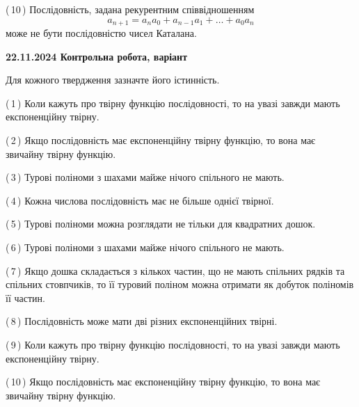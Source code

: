 \documentclass[12pt, ukrainian]{article}
\begin{document}
\begin {large}
\begin {large}
\begin {large}
\begin {large}
\begin {large}
\begin {large}
\begin {large}
\begin {large}
\begin {large}
\begin {large}
\begin {large}
\begin {large}
\begin {large}
\begin {large}
\begin {large}
\begin {large}
\begin {large}
\begin {large}
\begin {large}
\begin {large}
\begin {large}
\begin {large}
\begin {large}
\begin {large}
\begin {large}
\begin {large}
{(\,10\,) Послідовність, задана рекурентним співвідношенням $$a_{n+1}=a_{n}a_{0}+a_{n-1}a_{1}+\ldots+a_0a_{n}$$ може не бути послідовністю чисел Каталана.%




\vspace{5mm}
}
\newpage

\begin {large}

\textbf{22.11.2024 Контрольна робота, варіант  }\par


{
Для кожного твердження зазначте його істинність.\par

\vspace{2mm}

(\,1\,) Коли кажуть про твірну функцію послідовності, то на увазі завжди мають експоненційну твірну.%



(\,2\,) Якщо послідовність має експоненційну твірну функцію, то вона має звичайну твірну функцію.%



(\,3\,) Турові поліноми з шахами майже нічого спільного не мають.%



(\,4\,) Кожна числова послідовність має не більше однієї твірної.%



(\,5\,) Турові поліноми можна розглядати не тільки для квадратних дошок.%



(\,6\,) Турові поліноми з шахами майже нічого спільного не мають.%



(\,7\,) Якщо дошка складається з кількох частин, що не мають спільних рядків та спільних стовпчиків, то її туровий поліном можна отримати як добуток поліномів її частин.%



(\,8\,) Послідовність може мати дві різних експоненційних твірні.%



(\,9\,) Коли кажуть про твірну функцію послідовності, то на увазі завжди мають експоненційну твірну.%



(\,10\,) Якщо послідовність має експоненційну твірну функцію, то вона має звичайну твірну функцію.%




}
\end{large}
\end{large}
\end{large}
\end{large}
\end{large}
\end{large}
\end{large}
\end{large}
\end{large}
\end{large}
\end{large}
\end{large}
\end{large}
\end{large}
\end{large}
\end{large}
\end{large}
\end{large}
\end{large}
\end{large}
\end{large}
\end{large}
\end{large}
\end{large}
\end{large}
\end{large}
\end{large}
\end{document}
